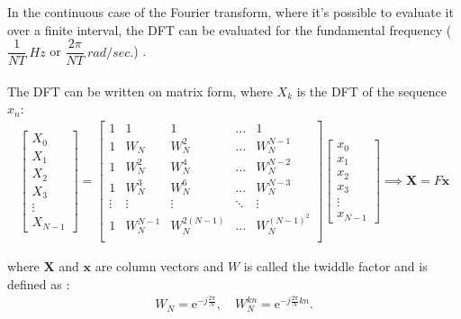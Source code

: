 In the continuous case of the Fourier transform, where it's possible to evaluate it over a finite interval, the DFT can be evaluated for the fundamental frequency ($\dfrac{1}{NT} \ Hz$ or $\dfrac{2\pi}{NT} \ rad/sec.$) \cite{DFT_OX}.
%
\\ \\
The DFT can be written on matrix form, where $X_k$ is the DFT of the sequence $x_n$:
\begin{align} \label{eq:DFT_matrix}
	\begin{bmatrix}
		X_0\\ X_1\\ X_2\\ X_3 \\ \vdots \\ X_{N-1}
	\end{bmatrix}
	=
	\begin{bmatrix}
		1 & 1 	& 1   	& \hdots & 1\\
		1 & W_N 	& W_N^2 	& \hdots & W_N^{N-1} \\
		1 & W_N^2	& W_N^4	& \hdots & W_N^{N-2} \\
		1 & W_N^3	& W_N^6	& \hdots & W_N^{N-3} \\
		\vdots & \vdots & \vdots & \ddots & \vdots \\
		1 & W_N^{N-1}	& W_N^{2(N-1)}	& \hdots & 						W_N^{(N-1)^2} \\
	\end{bmatrix}
	\begin{bmatrix}
		x_0\\ x_1\\ x_2\\ x_3\\ \vdots \\ x_{N-1}
	\end{bmatrix} 
	\implies
	\textbf{X} = F\textbf{x}
\end{align}

where $\textbf{X}$ and $\textbf{x}$ are column vectors and $W$ is called the twiddle factor and is defined as \cite{DFT_OX}:
\begin{align*}
	W_N = \text{e}^{-j\frac{2 \pi}{N}}, \quad W_N^{kn} = \text{e}^{-j\frac{2 \pi}{N}kn}.
\end{align*}

